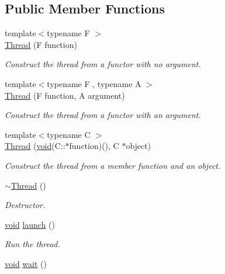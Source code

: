 \subsection*{Public Member Functions}
\begin{DoxyCompactItemize}
\item 
{\footnotesize template$<$typename F $>$ }\\\hyperlink{classsf_1_1_thread_a4cc65399bbb111cf8132537783b8e96c}{Thread} (F function)
\begin{DoxyCompactList}\small\item\em Construct the thread from a functor with no argument. \end{DoxyCompactList}\item 
{\footnotesize template$<$typename F , typename A $>$ }\\\hyperlink{classsf_1_1_thread_a719b2cc067d92d52c35064a49d850a53}{Thread} (F function, A argument)
\begin{DoxyCompactList}\small\item\em Construct the thread from a functor with an argument. \end{DoxyCompactList}\item 
{\footnotesize template$<$typename C $>$ }\\\hyperlink{classsf_1_1_thread_aa9f473c8cbb078900c62b1fd14a83a34}{Thread} (\hyperlink{glutf90_8h_ac778d6f63f1aaf8ebda0ce6ac821b56e}{void}(C\-::$\ast$function)(), C $\ast$object)
\begin{DoxyCompactList}\small\item\em Construct the thread from a member function and an object. \end{DoxyCompactList}\item 
\hyperlink{classsf_1_1_thread_af77942fc1730af7c31bc4c3a913a9c1d}{$\sim$\-Thread} ()
\begin{DoxyCompactList}\small\item\em Destructor. \end{DoxyCompactList}\item 
\hyperlink{glutf90_8h_ac778d6f63f1aaf8ebda0ce6ac821b56e}{void} \hyperlink{classsf_1_1_thread_a74f75a9e86e1eb47479496314048b5f6}{launch} ()
\begin{DoxyCompactList}\small\item\em Run the thread. \end{DoxyCompactList}\item 
\hyperlink{glutf90_8h_ac778d6f63f1aaf8ebda0ce6ac821b56e}{void} \hyperlink{classsf_1_1_thread_a724b1f94c2d54f84280f2f78bde95fa0}{wait} ()

\end{DoxyCompactItemize}
